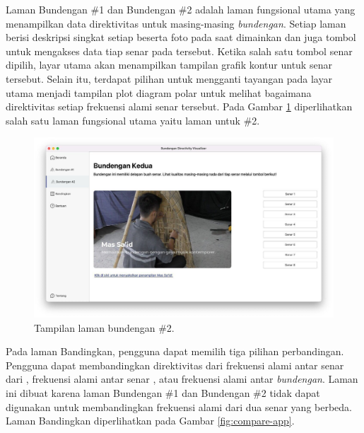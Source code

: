 Laman Bundengan \#1 dan Bundengan \#2 adalah laman fungsional utama yang menampilkan data direktivitas untuk masing-masing \emph{bundengan}. Setiap laman berisi deskripsi singkat setiap \bundengan beserta foto pada saat dimainkan dan juga tombol untuk mengakses data tiap senar pada \bundengan tersebut. Ketika salah satu tombol senar dipilih, layar utama akan menampilkan tampilan grafik kontur untuk senar tersebut. Selain itu, terdapat pilihan untuk mengganti tayangan pada layar utama menjadi tampilan plot diagram polar untuk melihat bagaimana direktivitas setiap frekuensi alami senar tersebut. Pada Gambar \ref{fig:b2-app} diperlihatkan salah satu laman fungsional utama yaitu laman untuk \bundengan \#2. \par 

\begin{figure}[b!]
	\centering
	\includegraphics[width=13.5cm]{Gambar/laman-bundengan-2.jpg}
	\caption{Tampilan laman bundengan \#2.}
	\label{fig:b2-app}
\end{figure}

Pada laman Bandingkan, pengguna dapat memilih tiga pilihan perbandingan. Pengguna dapat membandingkan direktivitas dari frekuensi alami antar senar dari , frekuensi alami antar senar , atau frekuensi alami antar \emph{bundengan}. Laman ini dibuat karena laman Bundengan \#1 dan Bundengan \#2 tidak dapat digunakan untuk membandingkan frekuensi alami dari dua senar yang berbeda. Laman Bandingkan diperlihatkan pada Gambar \ref{fig:compare-app}. \par 

